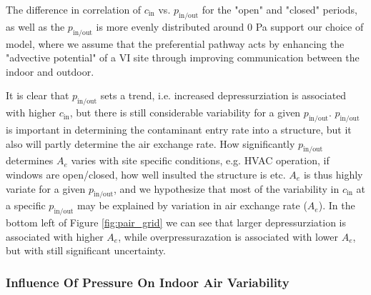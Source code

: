 \documentclass[journal=esthag,manuscript=article]{achemso}
\begin{document}
The difference in correlation of $c_\mathrm{in}$ vs. $p_\mathrm{in/out}$ for the "open" and "closed" periods, as well as the $p_\mathrm{in/out}$ is more evenly distributed around 0 Pa support our choice of model, where we assume that the preferential pathway acts by enhancing the "advective potential" of a VI site through improving communication between the indoor and outdoor.

It is clear that $p_\mathrm{in/out}$ sets a trend, i.e. increased depressurziation is associated with higher $c_\mathrm{in}$, but there is still considerable variability for a given $p_\mathrm{in/out}$.
$p_\mathrm{in/out}$ is important in determining the contaminant entry rate into a structure, but it also will partly determine the air exchange rate.
How significantly $p_\mathrm{in/out}$ determines $A_e$ varies with site specific conditions, e.g. HVAC operation, if windows are open/closed, how well insulted the structure is etc.
$A_e$ is thus highly variate for a given $p_\mathrm{in/out}$, and we hypothesize that most of the variability in $c_\mathrm{in}$ at a specific $p_\mathrm{in/out}$ may be explained by variation in air exchange rate ($A_e$).
In the bottom left of Figure \ref{fig:pair_grid} we can see that larger depressurziation is associated with higher $A_e$, while overpressurazation is associated with lower $A_e$, but with still significant uncertainty.



\subsubsection{Influence Of Pressure On Indoor Air Variability}
\end{document}
